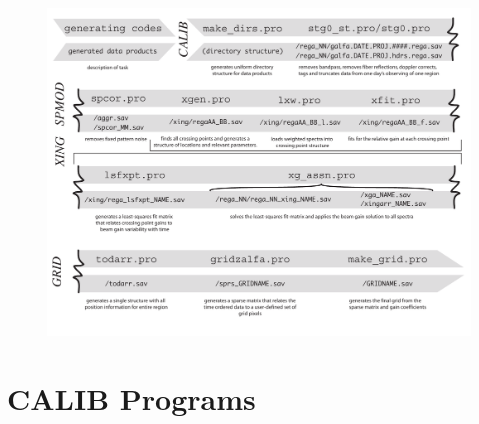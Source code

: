 \documentclass[11pt]{article}
\begin{document}
\begin{figure}[htbp]
	\begin{center}
	\includegraphics[scale=0.75, angle=90]{Flow_chart.pdf}
	\label{fc}
	\end{center}
\end{figure}

\section{CALIB Programs}
\end{document}
